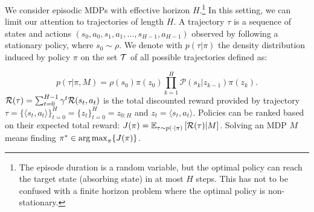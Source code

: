 We consider episodic \acs{MDP}s with effective horizon $H$.\footnote{The episode duration is a random variable, but the optimal policy can reach the target state (\ie absorbing state) in at most $H$ steps. This has not to be confused with a finite horizon problem where the optimal policy is non-stationary.} In this setting, we can limit our attention to trajectories of length $H$. A trajectory $\tau$ is a sequence of states and actions $(s_0,a_0,s_1,a_1,\dots,s_{H-1},a_{H-1})$ observed by following a stationary policy, where $s_0 \sim \rho$.
We denote with $p(\tau|\pi)$ the density distribution induced by policy $\pi$ on the set $\Tspace$ of all possible trajectories defined as:

\[
p(\tau|\pi,M) = \rho(s_0) \pi(z_0) \prod_{k=1}^{H} \mathcal{P}(s_k|z_{k-1})\pi(z_k).
\]
%
$\Reward(\tau) = \sum_{t=0}^{H-1}\gamma^t\Reward(s_t,a_t)$ is the total discounted reward provided by trajectory $\tau = \{\langle s_t,a_t \rangle\}_{t=0}^{H}= \{z_t\}_{t=0}^{H} = z_{0:H}$ and $z_t=\langle s_t,a_t \rangle.$\newline 
%
Policies can be ranked based on their expected total reward: $J(\pi) = \EVV[\tau \sim p(\cdot|\pi)]{\Reward(\tau)|M}$.
Solving an \acs{MDP} $M$ means finding $\pi^* \in \argmax_{\pi} \{J(\pi)\}$.

